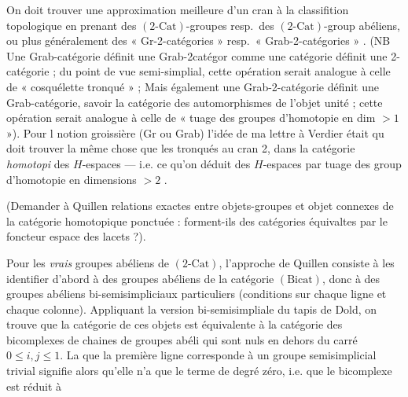 \documentclass[11pt,a4paper]{article}
\begin{document}
On doit trouver une approximation meilleure d'un cran à la classifition
topologique en prenant des $(2\text{-Cat})$-groupes resp.\ des
$(2\text{-Cat})$-group abéliens, ou plus généralement des
« Gr-2-catégories » resp.\ « Grab-2-catégories » . (NB Une Grab-catégorie
définit une Grab-2catégor comme une catégorie définit une
2-catégorie ; du point de vue semi-simplial, cette opération serait
analogue à celle de « cosquélette tronqué » ; Mais également une
Grab-2-catégorie définit une Grab-catégorie, savoir la catégorie des
automorphismes de l'objet unité ; cette opération serait analogue à celle de
« tuage des groupes d'homotopie en dim $> 1$ »). Pour l notion
groissière (Gr ou Grab) l'idée de ma lettre à Verdier était qu doit
trouver la même chose que les tronqués au cran 2, dans la catégorie
\emph{homotopi} des $H$-espaces --- i.e. ce qu'on déduit des
$H$-espaces par tuage des group d'homotopie en dimensions $> 2$ .

(Demander à Quillen relations exactes entre objets-groupes et objet
connexes de la catégorie homotopique ponctuée : forment-ils des catégories
équivaltes par le foncteur espace des lacets ?).

Pour les \emph{vrais} groupes abéliens de $(2\text{-Cat})$, l'approche de
Quillen consiste à les identifier d'abord à des groupes abéliens de la
catégorie $(\mathrm{Bicat})$, donc à des groupes abéliens bi-semisimpliciaux
particuliers (conditions sur chaque ligne et chaque colonne). Appliquant la
version bi-semisimpliale du tapis de Dold, on trouve que la catégorie
de ces objets est équivalente à la catégorie des bicomplexes de chaines de
groupes abéli qui sont nuls en dehors du carré $0 \leq i, j \leq 1$.
La   que la première ligne corresponde
à un groupe semisimplicial trivial signifie alors qu'elle n'a que le terme de
degré zéro, i.e. que le bicomplexe est réduit à
\end{document}
